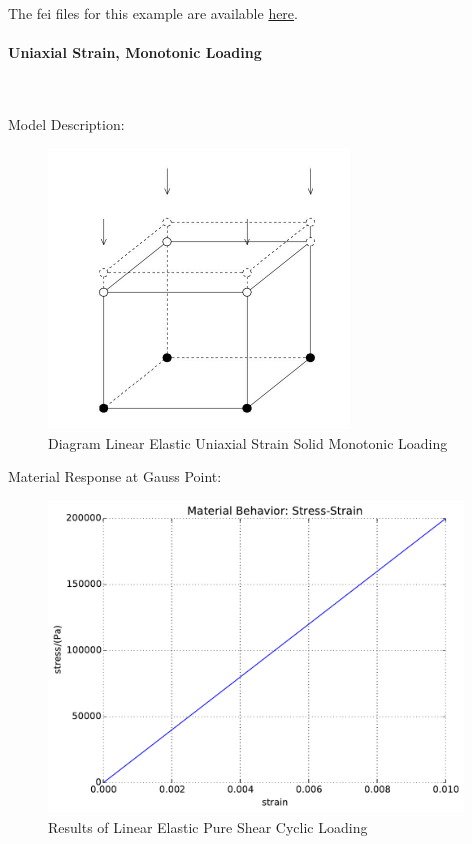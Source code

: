 \documentclass[fleqn,11pt]{article}
\begin{document}
The fei files for this example are available \href{https://github.com/yuan-energy/education_examples/tree/master/fei_examples/linear_elastic_solid/2pure_shear_cyclic_loading}{here}.


\newpage
\paragraph{Uniaxial Strain, Monotonic Loading} ~

Model Description:

\begin{figure}[H]
\begin{center}
\includegraphics[width=8cm]{../Figure-files/vertical.JPG}
\caption{
\label{Diagram Linear Elastic Uniaxial Strain Solid Monotonic Loadin}
Diagram Linear Elastic Uniaxial Strain Solid Monotonic Loading}
\end{center}
\end{figure}

Material Response at Gauss Point:
\begin{figure}[H]
\begin{center}
\includegraphics[width=11cm]{../fei_examples/linear_elastic_solid/3uniaxial_strain_mono_loading/result.pdf}
\caption{
\label{Results of Linear Elastic Solid Pure Shear Cyclic Loadin}
Results of Linear Elastic Pure Shear Cyclic Loading}
\end{center}
\end{figure}
\end{document}
